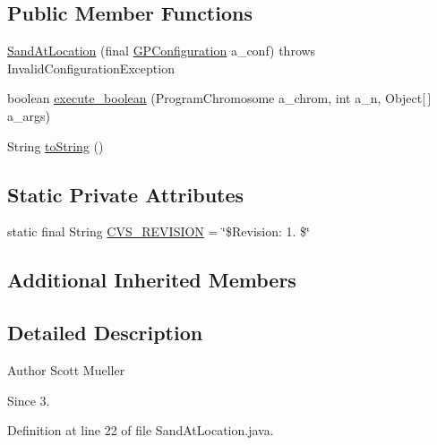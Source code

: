 \subsection*{Public Member Functions}
\begin{DoxyCompactItemize}
\item 
\hyperlink{classexamples_1_1gp_1_1painted_desert_1_1_sand_at_location_aa7a461b3f830c023b8a06d5cdfb90764}{Sand\-At\-Location} (final \hyperlink{classorg_1_1jgap_1_1gp_1_1impl_1_1_g_p_configuration}{G\-P\-Configuration} a\-\_\-conf)  throws Invalid\-Configuration\-Exception 
\item 
boolean \hyperlink{classexamples_1_1gp_1_1painted_desert_1_1_sand_at_location_a6307052f6ca23aeb85749a0c6a409bc7}{execute\-\_\-boolean} (Program\-Chromosome a\-\_\-chrom, int a\-\_\-n, Object\mbox{[}$\,$\mbox{]} a\-\_\-args)
\item 
String \hyperlink{classexamples_1_1gp_1_1painted_desert_1_1_sand_at_location_ac889a31797290069e83f1d84a50fafe6}{to\-String} ()
\end{DoxyCompactItemize}
\subsection*{Static Private Attributes}
\begin{DoxyCompactItemize}
\item 
static final String \hyperlink{classexamples_1_1gp_1_1painted_desert_1_1_sand_at_location_a9ac1d91c68aec6b765416f159db61252}{C\-V\-S\-\_\-\-R\-E\-V\-I\-S\-I\-O\-N} = \char`\"{}\$Revision\-: 1. \$\char`\"{}
\end{DoxyCompactItemize}
\subsection*{Additional Inherited Members}


\subsection{Detailed Description}
\begin{DoxyAuthor}{Author}
Scott Mueller 
\end{DoxyAuthor}
\begin{DoxySince}{Since}
3. 
\end{DoxySince}


Definition at line 22 of file Sand\-At\-Location.\-java.




